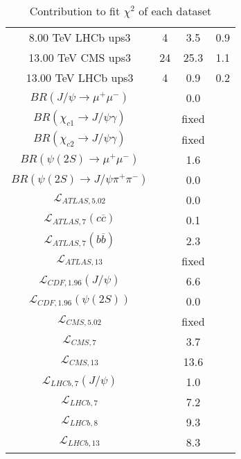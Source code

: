 \begin{table}[h!]
\begin{tabular}{c|c|c|c}
8.00 TeV LHCb ups3 & 4 & 3.5 & 0.9 \\
13.00 TeV CMS ups3 & 24 & 25.3 & 1.1 \\
13.00 TeV LHCb ups3 & 4 & 0.9 & 0.2 \\
\hline
$BR(J/\psi\rightarrow\mu^+\mu^-)$ &  & 0.0 &  \\
$BR(\chi_{c1}\rightarrow J/\psi\gamma)$ &  & fixed & \\
$BR(\chi_{c2}\rightarrow J/\psi\gamma)$ &  & fixed & \\
$BR(\psi(2S)\rightarrow\mu^+\mu^-)$ &  & 1.6 &  \\
$BR(\psi(2S)\rightarrow J/\psi\pi^+\pi^-)$ &  & 0.0 &  \\
$\mathcal L_{ATLAS,5.02}$ &  & 0.0 &  \\
$\mathcal L_{ATLAS,7}(c\overline c)$ &  & 0.1 &  \\
$\mathcal L_{ATLAS,7}(b\overline b)$ &  & 2.3 &  \\
$\mathcal L_{ATLAS,13}$ &  & fixed & \\
$\mathcal L_{CDF,1.96}(J/\psi)$ &  & 6.6 &  \\
$\mathcal L_{CDF,1.96}(\psi(2S))$ &  & 0.0 &  \\
$\mathcal L_{CMS,5.02}$ &  & fixed & \\
$\mathcal L_{CMS,7}$ &  & 3.7 &  \\
$\mathcal L_{CMS,13}$ &  & 13.6 &  \\
$\mathcal L_{LHCb,7}(J/\psi)$ &  & 1.0 &  \\
$\mathcal L_{LHCb,7}$ &  & 7.2 &  \\
$\mathcal L_{LHCb,8}$ &  & 9.3 &  \\
$\mathcal L_{LHCb,13}$ &  & 8.3 &  \\
\end{tabular}
\caption{Contribution to fit $\chi^2$ of each dataset}
\end{table}
